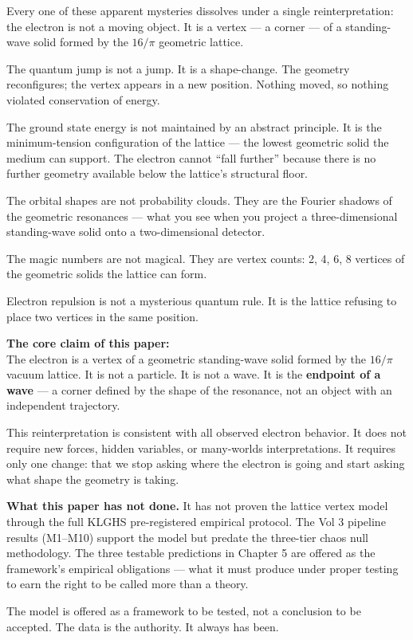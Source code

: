 \documentclass[11pt, letterpaper, openany]{book}
\begin{document}
Every one of these apparent mysteries dissolves under a single
reinterpretation: the electron is not a moving object. It is a
vertex — a corner — of a standing-wave solid formed by the
$16/\pi$ geometric lattice.

The quantum jump is not a jump. It is a shape-change. The geometry
reconfigures; the vertex appears in a new position. Nothing moved,
so nothing violated conservation of energy.

The ground state energy is not maintained by an abstract principle.
It is the minimum-tension configuration of the lattice — the lowest
geometric solid the medium can support. The electron cannot ``fall
further'' because there is no further geometry available below
the lattice's structural floor.

The orbital shapes are not probability clouds. They are the Fourier
shadows of the geometric resonances — what you see when you project
a three-dimensional standing-wave solid onto a two-dimensional
detector.

The magic numbers are not magical. They are vertex counts:
2, 4, 6, 8 vertices of the geometric solids the lattice can form.

Electron repulsion is not a mysterious quantum rule. It is the
lattice refusing to place two vertices in the same position.

\begin{theorybox}
\textbf{The core claim of this paper:}\\[0.5em]
The electron is a vertex of a geometric standing-wave solid formed
by the $16/\pi$ vacuum lattice. It is not a particle. It is not
a wave. It is the \textbf{endpoint of a wave} — a corner defined
by the shape of the resonance, not an object with an independent
trajectory.

This reinterpretation is consistent with all observed electron
behavior. It does not require new forces, hidden variables, or
many-worlds interpretations. It requires only one change: that
we stop asking where the electron is going and start asking what
shape the geometry is taking.
\end{theorybox}

\begin{warningbox}
\textbf{What this paper has not done.} It has not proven the
lattice vertex model through the full KLGHS pre-registered
empirical protocol. The Vol 3 pipeline results (M1--M10) support
the model but predate the three-tier chaos null methodology. The
three testable predictions in Chapter 5 are offered as the
framework's empirical obligations — what it must produce under
proper testing to earn the right to be called more than a theory.

The model is offered as a framework to be tested, not a conclusion
to be accepted. The data is the authority. It always has been.
\end{warningbox}
\end{document}
